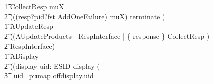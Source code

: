 \begin{circus}
        \t1 CollectResp \circdef \circmu muX \circspot \\
            \t2 (((resp?pid?fst \then AddOneFailure) \circseq muX) \extchoice terminate \then \Skip) \\
%
        \t1 AUpdateResp \circdef \\
        \t2 ((AUpdateProducts \lpar \emptyset | RespInterface | \{ response \} \rpar CollectResp ) \\
        \t2 \circhide RespInterface) \\
%
%
        \t1 ADisplay \circdef \\
        \t2 ((\lpar \lchanset display \rchanset \rpar uid: ESID \circspot \lpar \emptyset \rpar display \then ( \\
        \t3 \circif\ uid \notin \dom~pumap \circthen offdisplay.uid \then \Skip\\

\end{circus}
